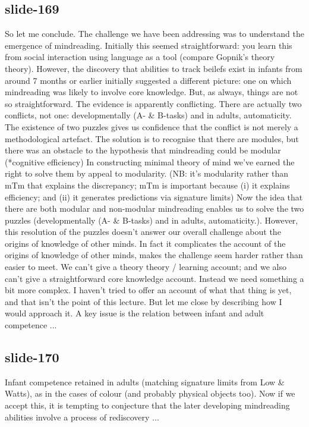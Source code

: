 \documentclass[12pt,\papersize]{extarticle}
\begin{document}
 
\subsection{slide-169}
So let me conclude.
The challenge we have been addressing was to understand the emergence of mindreading.
Initially this seemed straightforward: you learn this from social interaction using language as a tool (compare Gopnik's theory theory).
However, the discovery that abilities to track beilefs exist in infants from around 7 months or earlier initially suggested a different picture:
one on which mindreading was likely to involve core knowledge.
But, as always, things are not so straightforward. The evidence is apparently conflicting.
There are actually two conflicts, not one: developmentally (A- \& B-tasks) and in adults, automaticity.
The existence of two puzzles gives us confidence that the conflict is not merely a methodological artefact.
The solution is to recognise that there are modules, but there was an obstacle to the hypothesis that mindreading could be modular (*cognitive efficiency)
In constructing minimal theory of mind we've earned the right to solve them by appeal to modularity. (NB: it's modularity rather than mTm that explains the discrepancy; mTm is important because (i) it explains efficiency; and (ii) it generates predictions via signature limits)
Now the idea that there are both modular and non-modular mindreading enables us to solve the two puzzles (developmentally (A- \& B-tasks) and in adults, automaticity.).
However, this resolution of the puzzles doesn't answer our overall challenge about the origins of knowledge of other minds.
In fact it complicates the account of the origins of knowledge of other minds, makes the challenge seem harder rather than easier to meet.
We can't give a theory theory / learning account; and we also can't give a straightforward core knowledge account.
Instead we need something a bit more complex.
I haven't tried to offer an account of what that thing is yet, and that isn't the point of this lecture.
But let me close by describing how I would approach it.
A key issue is the relation between infant and adult competence ...
 
 
\subsection{slide-170}
Infant competence retained in adults (matching signature limits from Low \& Watts), as in the cases of colour (and probably physical objects too).
Now if we accept this, it is tempting to conjecture that the later developing mindreading abilities involve a process of rediscovery ...
 
\end{document}
